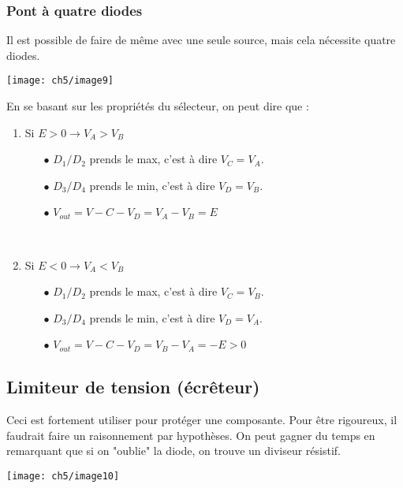 			\subsubsection{Pont à quatre diodes}
			Il est possible de faire de même avec une seule source, mais cela 
			nécessite quatre diodes.
			\begin{center}
			\texttt{[image: ch5/image9]}
			\end{center}		
			En se basant sur les propriétés du sélecteur, on peut dire que :
			\begin{multicols}{2}
			\begin{enumerate}
			\item Si $E>0 \rightarrow V_A>V_B$
				\begin{itemize}
				\item[$\bullet$] $D_1/D_2$ prends le max, c'est à dire $V_C=V_A$.
				\item[$\bullet$] $D_3/D_4$ prends le min, c'est à dire $V_D=V_B$.
				\item[$\bullet$] $V_{out} = V-C-V_D = V_A-V_B=E$
				\end{itemize}\ \\
				
			\item Si $E<0 \rightarrow V_A<V_B$
				\begin{itemize}
				\item[$\bullet$] $D_1/D_2$ prends le max, c'est à dire $V_C=V_B$.
				\item[$\bullet$] $D_3/D_4$ prends le min, c'est à dire $V_D=V_A$.
				\item[$\bullet$] $V_{out} = V-C-V_D = V_B-V_A=-E >0$
				\end{itemize}			
			\end{enumerate}
			\end{multicols}
		
		\subsection{Limiteur de tension (écrêteur)}
		Ceci est fortement utiliser pour protéger une composante. Pour être rigoureux, 
		il faudrait faire un raisonnement par hypothèses. On peut gagner du temps en 
		remarquant que si on "oublie" la diode, on trouve un diviseur résistif.
					\begin{center}
			\texttt{[image: ch5/image10]}
			\end{center}		
			

